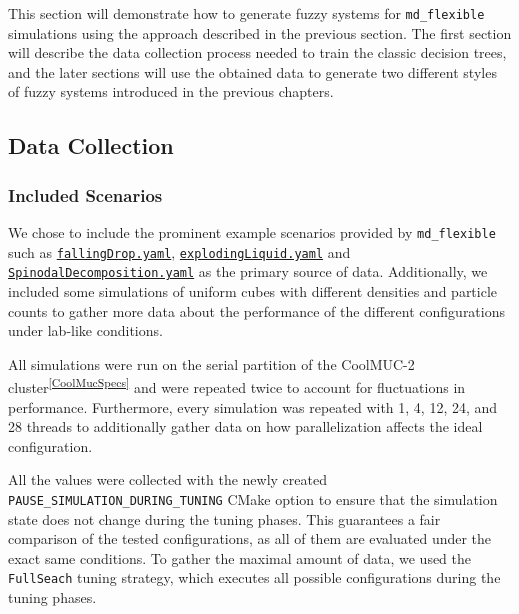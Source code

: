 This section will demonstrate how to generate fuzzy systems for \texttt{md\_flexible} simulations using the approach described in the previous section. The first section will describe the data collection process needed to train the classic decision trees, and the later sections will use the obtained data to generate two different styles of fuzzy systems introduced in the previous chapters.

\subsection{Data Collection}

\subsubsection{Included Scenarios}

We chose to include the prominent example scenarios provided by \texttt{md\_flexible} such as \href{https://github.com/AutoPas/AutoPas/blob/c25dc770f173ff160630d7e58f59b38e277032a1/examples/md-flexible/input/fallingDrop.yaml}{\color{blue}\texttt{fallingDrop.yaml}}, \href{https://github.com/AutoPas/AutoPas/blob/c25dc770f173ff160630d7e58f59b38e277032a1/examples/md-flexible/input/explodingLiquid.yaml}{\color{blue} \texttt{explodingLiquid.yaml}} and \href{https://github.com/AutoPas/AutoPas/blob/c25dc770f173ff160630d7e58f59b38e277032a1/examples/md-flexible/input/SpinodalDecomposition.yaml}{\color{blue} \texttt{SpinodalDecomposition.yaml}} as the primary source of data. Additionally, we included some simulations of uniform cubes with different densities and particle counts to gather more data about the performance of the different configurations under lab-like conditions.

All simulations were run on the serial partition of the CoolMUC-2 cluster\textsuperscript{\ref{CoolMucSpecs}} and were repeated twice to account for fluctuations in performance. Furthermore, every simulation was repeated with 1, 4, 12, 24, and 28 threads to additionally gather data on how parallelization affects the ideal configuration.

All the values were collected with the newly created \texttt{PAUSE\_SIMULATION\_DURING\_TUNING} CMake option to ensure that the simulation state does not change during the tuning phases. This guarantees a fair comparison of the tested configurations, as all of them are evaluated under the exact same conditions. To gather the maximal amount of data, we used the \texttt{FullSeach} tuning strategy, which executes all possible configurations during the tuning phases.


